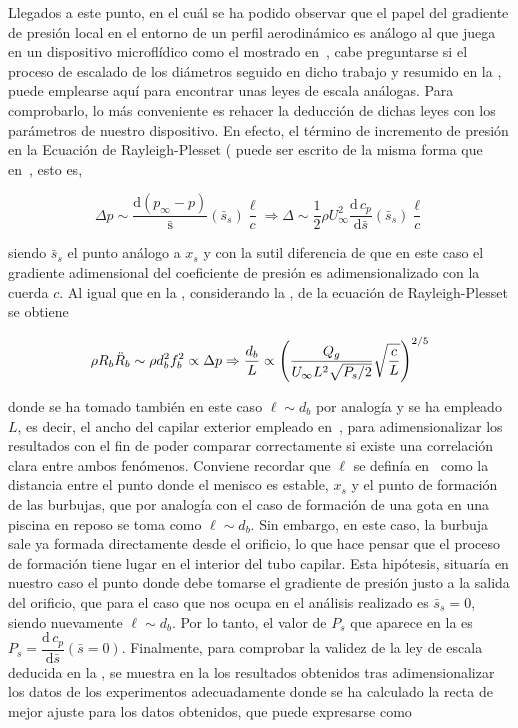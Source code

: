 Llegados a este punto, en el cuál se ha podido observar que el papel del gradiente de presión local en el entorno de un perfil aerodinámico es análogo al que juega en un dispositivo microflídico como el mostrado en~\cite{Evangelio2015}, cabe preguntarse si el proceso de escalado de los diámetros seguido en dicho trabajo y resumido en la , puede emplearse aquí para encontrar unas leyes de escala análogas. Para comprobarlo, lo más conveniente es rehacer la deducción de dichas leyes con los parámetros de nuestro dispositivo. En efecto, el término de incremento de presión en la Ecuación de Rayleigh-Plesset ( puede ser escrito de la misma forma que en~\cite{Evangelio2015}, esto es,

\begin{equation}
\Delta p \sim \dfrac{\mathrm{d}\left(p_{\infty}-p\right)}{\mathrm{\bar{s}}}\left(\bar{s}_{s}\right)\dfrac{\ell}{c} \Rightarrow \Delta \sim \dfrac{1}{2}\rho U_{\infty}^{2} \dfrac{\mathrm{d}\,c_{p}}{\mathrm{d}\bar{s}}\left(\bar{s}_{s}\right)\dfrac{\ell}{c}
\end{equation}

siendo $\bar{s}_{s}$ el punto análogo a $x_{s}$ y con la sutil diferencia de que en este caso el gradiente adimensional del coeficiente de presión es adimensionalizado con la cuerda $c$. Al igual que en la , considerando la , de la ecuación de Rayleigh-Plesset se obtiene

\begin{equation}
\rho R_{b}\ddot{R}_{b} \sim \rho d_{b}^{2}f_{b}^{2} \propto \Delta p \Rightarrow \dfrac{d_{b}}{L} \propto \left(\dfrac{Q_{g}}{U_{\infty}L^{2}\sqrt{P_{s}/2}}\sqrt{\dfrac{c}{L}}\right)^{2/5}
\LABEQ{escaladoFinal2D}
\end{equation}

donde se ha tomado también en este caso $\ell \sim d_{b}$ por analogía y se ha empleado $L$, es decir, el ancho del capilar exterior empleado en~\cite{Evangelio2015}, para adimensionalizar los resultados con el fin de poder comparar correctamente si existe una correlación clara entre ambos fenómenos. Conviene recordar que $\ell$ se definía en~\cite{Evangelio2015} como la distancia entre el punto donde el menisco es estable, $x_{s}$ y el punto de formación de las burbujas, que por analogía con el caso de formación de una gota en una piscina en reposo se toma como $\ell \sim d_{b}$. Sin embargo, en este caso, la burbuja sale ya formada directamente desde el orificio, lo que hace pensar que el proceso de formación tiene lugar en el interior del tubo capilar. Esta hipótesis, situaría en nuestro caso el punto donde debe tomarse el gradiente de presión justo a la salida del orificio, que para el caso que nos ocupa en el análisis realizado es $\bar{s}_{s} = 0$, siendo nuevamente $\ell \sim d_{b}$. Por lo tanto, el valor de $P_{s}$ que aparece en la  es $P_{s} = \dfrac{\mathrm{d}\,c_{p}}{\mathrm{d}\bar{s}}\left(\bar{s}=0\right)$. Finalmente, para comprobar la validez de la ley de escala deducida en la , se muestra en la  los resultados obtenidos tras adimensionalizar los datos de los experimentos adecuadamente donde se ha calculado la recta de mejor ajuste para los datos obtenidos, que puede expresarse como 

